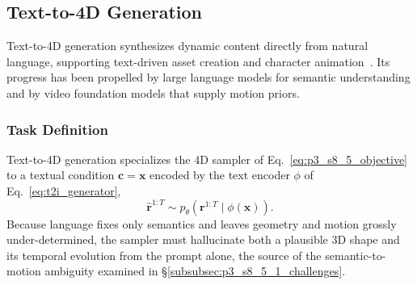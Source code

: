 \subsection{Text-to-4D Generation}
\label{subsec:p3_s8_5_1}
Text-to-4D generation synthesizes dynamic content directly from natural language, supporting text-driven asset creation and character animation~\cite{HongZPCYL22,chen2024ct4d}. Its progress has been propelled by large language models for semantic understanding and by video foundation models that supply motion priors.


\subsubsection{Task Definition}
\label{subsubsec:p3_s8_5_1_task}
Text-to-4D generation specializes the 4D sampler of Eq.~\eqref{eq:p3_s8_5_objective} to a textual condition $\mathbf{c}=\mathbf{x}$ encoded by the text encoder $\phi$ of Eq.~\eqref{eq:t2i_generator},
\begin{equation}
\label{eq:p3_s8_5_1_objective}
\hat{\mathbf{r}}^{1:T}\sim p_\theta\!\left(\mathbf{r}^{1:T}\mid\phi(\mathbf{x})\right).
\end{equation}
Because language fixes only semantics and leaves geometry and motion grossly under-determined, the sampler must hallucinate both a plausible 3D shape and its temporal evolution from the prompt alone, the source of the semantic-to-motion ambiguity examined in §\ref{subsubsec:p3_s8_5_1_challenges}.



